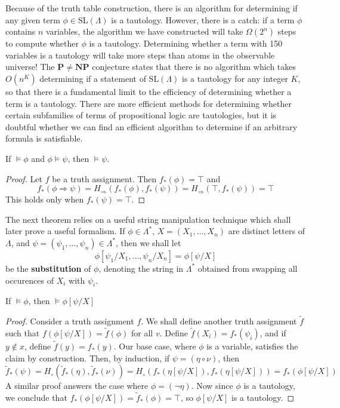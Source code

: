 Because of the truth table construction, there is an algorithm for determining if any given term $\phi \in \text{SL}(\Lambda)$ is a tautology. However, there is a catch: if a term $\phi$ contains $n$ variables, the algorithm we have constructed will take $\Omega(2^n)$ steps to compute whether $\phi$ is a tautology. Determining whether a term with 150 variables is a tautology will take more steps than atoms in the observable universe! The $\mathbf{P} \neq \mathbf{NP}$ conjecture states that there is no algorithm which takes $O(n^K)$ determining if a statement of $\text{SL}(\Lambda)$ is a tautology for any integer $K$, so that there is a fundamental limit to the efficiency of determining whether a term is a tautology. There are more efficient methods for determining whether certain subfamilies of terms of propositional logic are tautologies, but it is doubtful whether we can find an efficient algorithm to determine if an arbitrary formula is satisfiable.

\begin{theorem}
    If $\vDash \phi$ and $\phi \vDash \psi$, then $\vDash \psi$.
\end{theorem}
\begin{proof}
    Let $f$ be a truth assignment. Then $f_*(\phi) = \top$ and
    \[ f_*(\phi \Rightarrow \psi) = H_\Rightarrow(f_*(\phi),f_*(\psi)) = H_\Rightarrow(\top, f_*(\psi)) = \top \]
    This holds only when $f_*(\psi) = \top$.
\end{proof}

The next theorem relies on a useful string manipulation technique which shall later prove a useful formalism. If $\phi \in \Lambda^*$, $X = (X_1, \dots, X_n)$ are distinct letters of $\Lambda$, and $\psi = (\psi_1, \dots, \psi_n) \in \Lambda^*$, then we shall let
%
\[ \phi[\psi_1/X_1, \dots, \psi_n/X_n] = \phi[\psi/X] \]
%
be the {\bf substitution} of $\phi$, denoting the string in $\Lambda^*$ obtained from swapping all occurences of $X_i$ with $\psi_i$.

\begin{theorem}
    If $\vDash \phi$, then $\vDash \phi[\psi/X]$
\end{theorem}
\begin{proof}
    Consider a truth assignment $f$. We shall define another truth assignment $\tilde{f}$ such that $f(\phi[\psi/X]) = \tilde{f}(\phi)$ for all $v$. Define $\tilde{f}(X_i) = f_*(\psi_i)$, and if $y \not \in x$, define $\tilde{f}(y) = f_*(y)$. Our base case, where $\phi$ is a variable, satisfies the claim by construction. Then, by induction, if $\psi = (\eta \circ \nu)$, then
    \[ \tilde{f}_*(\psi) = H_\circ(\tilde{f}_*(\eta), \tilde{f}_*(\nu)) = H_\circ(f_*(\eta[\psi/X]), f_*(\eta[\psi/X])) = f_*(\phi[\psi/X]) \]
    A similar proof answers the case where $\phi = (\neg \eta)$. Now since $\phi$ is a tautology, we conclude that $f_*(\phi[\psi/X]) = \tilde{f}_*(\phi) = \top$, so $\phi[\psi/X]$ is a tautology.
\end{proof}

